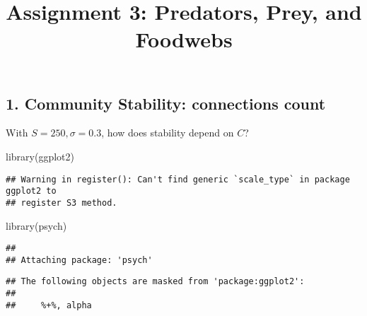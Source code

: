 \documentclass[
]{article}
\title{Assignment 3: Predators, Prey, and Foodwebs}
\author{}
\date{\vspace{-2.5em}}
\newenvironment{Shaded}{\begin{snugshade}}{\end{snugshade}}
\newcommand{\FunctionTok}[1]{\textcolor[rgb]{0.00,0.00,0.00}{#1}}
\newcommand{\NormalTok}[1]{#1}
\begin{document}
\maketitle

\hypertarget{community-stability-connections-count}{%
\subsection{1. Community Stability: connections
count}\label{community-stability-connections-count}}

With \(S=250,\sigma=0.3\), how does stability depend on \(C\)?

\begin{Shaded}
\begin{Highlighting}[]
\FunctionTok{library}\NormalTok{(ggplot2)}
\end{Highlighting}
\end{Shaded}

\begin{verbatim}
## Warning in register(): Can't find generic `scale_type` in package ggplot2 to
## register S3 method.
\end{verbatim}

\begin{Shaded}
\begin{Highlighting}[]
\FunctionTok{library}\NormalTok{(psych)}
\end{Highlighting}
\end{Shaded}

\begin{verbatim}
## 
## Attaching package: 'psych'
\end{verbatim}

\begin{verbatim}
## The following objects are masked from 'package:ggplot2':
## 
##     %+%, alpha
\end{verbatim}
\end{document}
